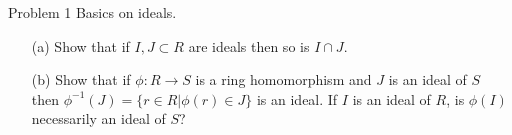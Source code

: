 \documentclass{hmwk}
\begin{document}
\maketitle

\begin{problem}{Problem 1}
Basics on ideals.
\begin{itemize}
    \item[(a)] Show that if $I, J \subset R$ are ideals then so is $I \cap J$.
    \item[(b)] Show that if $\phi: R \to S$ is a ring homomorphism and $J$ is an ideal of $S$ then $\phi^{-1} (J) = \{ r \in R | \phi(r) \in J\}$ is an ideal.  If $I$ is an ideal of $R$, is $\phi(I)$ necessarily an ideal of $S$?
\end{itemize}
\end{problem}
\end{document}
